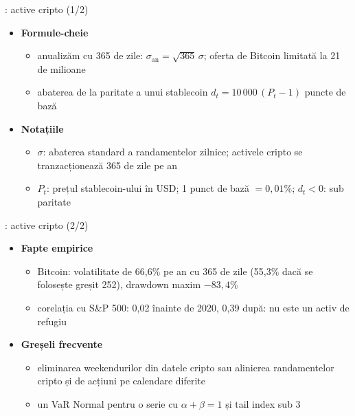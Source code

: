 \begin{frame}{: active cripto (1/2)}
\itemsize{\small}
\begin{itemize}
    \item \textbf{Formule-cheie}
    \begin{itemize}
        \item anualizăm cu 365 de zile: $\sigma_{\text{an}} = \sqrt{365}\,\sigma$; oferta de Bitcoin limitată la 21 de milioane 
        \item abaterea de la paritate a unui stablecoin $d_t = 10\,000\,(P_t - 1)$ puncte de bază
    \end{itemize}
    \item \textbf{Notațiile}
    \begin{itemize}
        \item $\sigma$: abaterea standard a randamentelor zilnice; activele cripto se tranzacționează 365 de zile pe an
        \item $P_t$: prețul stablecoin-ului în USD; 1 punct de bază $= 0{,}01\%$; $d_t < 0$: sub paritate
    \end{itemize}
\end{itemize}
\end{frame}

\begin{frame}{: active cripto (2/2)}
\itemsize{\small}
\begin{itemize}
    \item \textbf{Fapte empirice}
    \begin{itemize}
        \item Bitcoin: volatilitate de 66{,}6\% pe an cu 365 de zile (55{,}3\% dacă se folosește greșit 252), drawdown maxim $-83{,}4\%$
        \item corelația cu S\&P 500: 0{,}02 înainte de 2020, 0{,}39 după: nu este un activ de refugiu
    \end{itemize}
    \item \textbf{Greșeli frecvente}
    \begin{itemize}
        \item eliminarea weekendurilor din datele cripto sau alinierea randamentelor cripto și de acțiuni pe calendare diferite
        \item un VaR Normal pentru o serie cu $\alpha + \beta = 1$ și tail index sub 3
    \end{itemize}
\end{itemize}
\end{frame}

